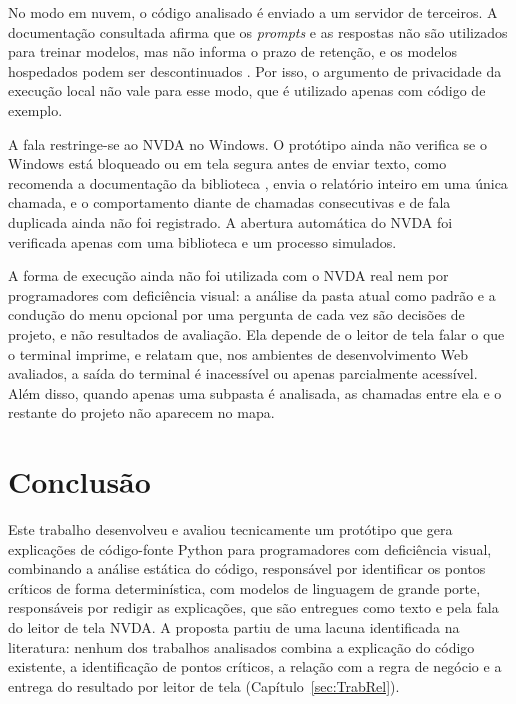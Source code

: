 \documentclass[
    12pt,                   %
    openright,              %
    oneside,                %
    a4paper,                %
    sumario=tradicional,    %
    english,                %
    brazil,                 %
    ]{abntex2}
\begin{document}
No modo em nuvem, o código analisado é enviado a um servidor de terceiros. A documentação consultada afirma que os \textit{prompts} e as respostas não são utilizados para treinar modelos, mas não informa o prazo de retenção, e os modelos hospedados podem ser descontinuados \cite{ollama2026nuvem}. Por isso, o argumento de privacidade da execução local não vale para esse modo, que é utilizado apenas com código de exemplo.

A fala restringe-se ao NVDA no Windows. O protótipo ainda não verifica se o Windows está bloqueado ou em tela segura antes de enviar texto, como recomenda a documentação da biblioteca \cite{nvaccess2024controller}, envia o relatório inteiro em uma única chamada, e o comportamento diante de chamadas consecutivas e de fala duplicada ainda não foi registrado. A abertura automática do NVDA foi verificada apenas com uma biblioteca e um processo simulados.

A forma de execução ainda não foi utilizada com o NVDA real nem por programadores com deficiência visual: a análise da pasta atual como padrão e a condução do menu opcional por uma pergunta de cada vez são decisões de projeto, e não resultados de avaliação. Ela depende de o leitor de tela falar o que o terminal imprime, e \textcite{latinoware6969} relatam que, nos ambientes de desenvolvimento Web avaliados, a saída do terminal é inacessível ou apenas parcialmente acessível. Além disso, quando apenas uma subpasta é analisada, as chamadas entre ela e o restante do projeto não aparecem no mapa.


\chapter{Conclusão}\label{sec:conclusao}

Este trabalho desenvolveu e avaliou tecnicamente um protótipo que gera explicações de código-fonte Python para programadores com deficiência visual, combinando a análise estática do código, responsável por identificar os pontos críticos de forma determinística, com modelos de linguagem de grande porte, responsáveis por redigir as explicações, que são entregues como texto e pela fala do leitor de tela NVDA. A proposta partiu de uma lacuna identificada na literatura: nenhum dos trabalhos analisados combina a explicação do código existente, a identificação de pontos críticos, a relação com a regra de negócio e a entrega do resultado por leitor de tela (Capítulo~\ref{sec:TrabRel}).
\end{document}
